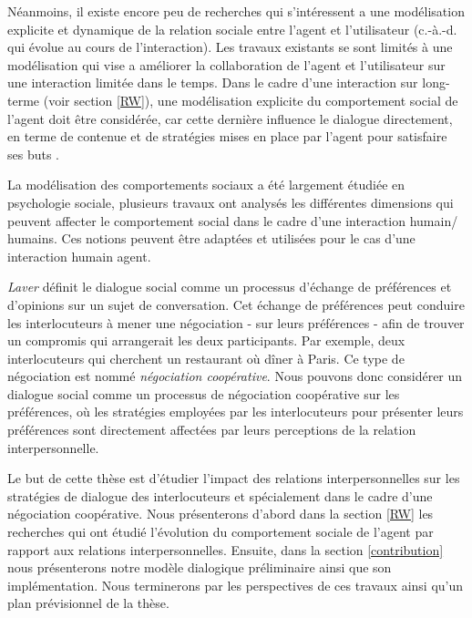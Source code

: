 \documentclass[a4paper,french]{article}
\begin{document}
\par Néanmoins, il existe encore peu de recherches qui s’intéressent a une modélisation explicite et dynamique de la relation sociale entre l’agent et l’utilisateur (c.-à.-d. qui évolue au cours de l'interaction). Les travaux existants se sont limités à une modélisation qui vise a améliorer la collaboration de l’agent et l'utilisateur sur une interaction limitée dans le temps. Dans le cadre d'une interaction sur long-terme (voir section \ref{RW}), une modélisation explicite du comportement social de l’agent doit être considérée, car cette dernière influence le dialogue directement, en terme de contenue et de stratégies mises en place par l’agent pour satisfaire ses buts \cite{bickmore2012empirical}.

\par La modélisation des comportements sociaux a été largement étudiée en psychologie sociale, plusieurs travaux ont analysés les différentes dimensions qui peuvent affecter le comportement social dans le cadre d’une interaction humain/ humains. Ces notions peuvent être adaptées et utilisées pour le cas d’une interaction humain agent.

 \par \emph{Laver}\cite{laver1981linguistic} définit le dialogue social comme un processus d'échange de préférences et d'opinions sur un sujet de conversation. Cet échange de préférences peut conduire les interlocuteurs à mener une négociation - sur leurs préférences - afin de trouver un compromis qui arrangerait les deux participants. Par exemple, deux interlocuteurs qui cherchent un restaurant où dîner à Paris. Ce type de négociation est nommé \emph{négociation coopérative}. Nous pouvons donc considérer un dialogue social comme un processus de négociation coopérative sur les préférences, où les stratégies employées par les interlocuteurs pour présenter leurs préférences sont directement affectées par leurs perceptions de la relation interpersonnelle.

\par Le but de cette thèse est d'étudier l'impact des relations interpersonnelles sur les stratégies de dialogue des interlocuteurs et spécialement dans le cadre d'une négociation coopérative. Nous présenterons d'abord dans la section \ref{RW} les recherches qui ont étudié l'évolution du comportement sociale de l'agent par rapport aux relations interpersonnelles. Ensuite, dans la section \ref{contribution} nous présenterons notre modèle dialogique préliminaire ainsi que son implémentation. Nous terminerons par les perspectives de ces travaux ainsi qu'un plan prévisionnel de la thèse.
\end{document}
